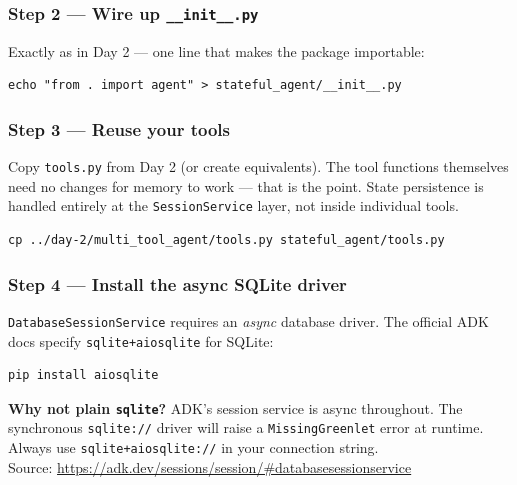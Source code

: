 \documentclass[12pt, a4paper]{article}
\begin{document}
\begin{practicalbox}
\subsubsection*{Step 2 --- Wire up \texttt{\_\_init\_\_.py}}

Exactly as in Day 2 --- one line that makes the package importable:

\begin{lstlisting}[style=bashstyle]
echo "from . import agent" > stateful_agent/__init__.py
\end{lstlisting}

\subsubsection*{Step 3 --- Reuse your tools}

Copy \texttt{tools.py} from Day 2 (or create equivalents). The tool functions
themselves need no changes for memory to work --- that is the point. State
persistence is handled entirely at the \texttt{SessionService} layer, not
inside individual tools.

\begin{lstlisting}[style=bashstyle]
cp ../day-2/multi_tool_agent/tools.py stateful_agent/tools.py
\end{lstlisting}

\subsubsection*{Step 4 --- Install the async SQLite driver}


\texttt{DatabaseSessionService} requires an \emph{async} database driver.
The official ADK docs specify \texttt{sqlite+aiosqlite} for SQLite:

\begin{lstlisting}[style=bashstyle]
pip install aiosqlite
\end{lstlisting}

\begin{notebox}
\textbf{Why not plain \texttt{sqlite}?} ADK's session service is async
throughout. The synchronous \texttt{sqlite://} driver will raise a
\texttt{MissingGreenlet} error at runtime. Always use
\texttt{sqlite+aiosqlite://} in your connection string.\\[2pt]
Source: \url{https://adk.dev/sessions/session/\#databasesessionservice}
\end{notebox}


\end{practicalbox}
\end{document}
